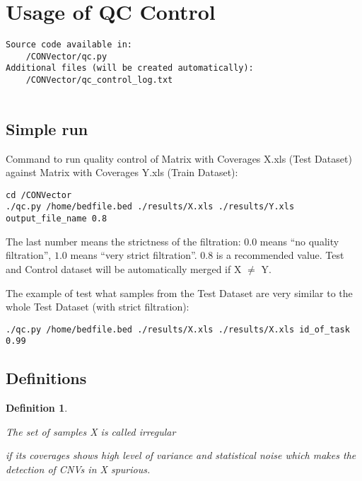 \documentclass{article}
\newtheorem{mydef}{Definition}
\begin{document}
\newpage
\section{Usage of QC Control}

\begin{verbatim}
Source code available in:
    /CONVector/qc.py
Additional files (will be created automatically):
    /CONVector/qc_control_log.txt
    
\end{verbatim}





\subsection{Simple run}

\hypertarget{averageRobustVariance}{Command to run quality control of Matrix with Coverages X.xls (Test Dataset) against Matrix with Coverages Y.xls (Train Dataset): }

\begin{lstlisting}[style=DOS, caption={Simple run of the QC control}]
cd /CONVector
./qc.py /home/bedfile.bed ./results/X.xls ./results/Y.xls output_file_name 0.8
\end{lstlisting}

The last number means the strictness of the filtration: $0.0$ means ``no quality filtration'', $1.0$ means ``very strict filtration''. $0.8$ is a recommended value. Test and Control dataset will be automatically merged if X $\neq$ Y.

The example of \hypertarget{runWithStrictFiltration}{test what samples from the Test Dataset are very similar to the whole Test Dataset (with strict filtration):}

\begin{lstlisting}[style=DOS, caption={QC control to find samples from the Test Dataset that are similar to the Test Dataset}]
./qc.py /home/bedfile.bed ./results/X.xls ./results/X.xls id_of_task 0.99
\end{lstlisting}





\subsection{Definitions}

\begin{mydef}
\hypertarget{irregular}{The set of samples X is called irregular} if its coverages shows high level of variance and statistical noise which makes the detection of CNVs in X spurious.  
\end{mydef}
\end{document}

